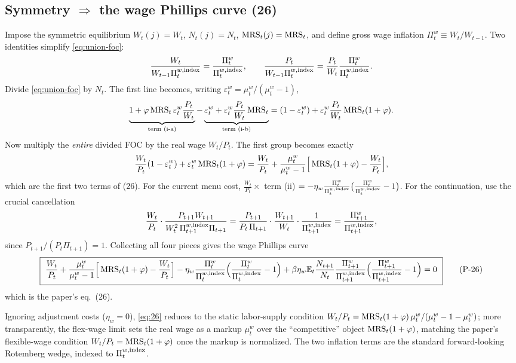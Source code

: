 \subsection{Symmetry \texorpdfstring{$\Rightarrow$}{=>} the wage Phillips curve (26)}
Impose the symmetric equilibrium $W_t(j)=W_t$, $N_t(j)=N_t$, $\operatorname{MRS}_t(j)=\operatorname{MRS}_t$, and define gross wage
inflation $\Pi^w_t\equiv W_t/W_{t-1}$. Two identities simplify \eqref{eq:union-foc}:
\[
\frac{W_t}{W_{t-1}\Pi^{w,\text{index}}_t}=\frac{\Pi^w_t}{\Pi^{w,\text{index}}_t},\qquad
\frac{P_t}{W_{t-1}\Pi^{w,\text{index}}_t}=\frac{P_t}{W_t}\frac{\Pi^w_t}{\Pi^{w,\text{index}}_t}.
\]
Divide \eqref{eq:union-foc} by $N_t$. The first line becomes, writing $\varepsilon^w_t=\mu^w_t/(\mu^w_t-1)$,
\[
\underbrace{1+\varphi\operatorname{MRS}_t\varepsilon^w_t\frac{P_t}{W_t}}_{\text{term (i-a)}}
-\underbrace{\varepsilon^w_t+\varepsilon^w_t\frac{P_t}{W_t}\operatorname{MRS}_t}_{\text{term (i-b)}}
=(1-\varepsilon^w_t)+\varepsilon^w_t\frac{P_t}{W_t}\operatorname{MRS}_t(1+\varphi).
\]
Now multiply the \emph{entire} divided FOC by the real wage $W_t/P_t$. The first group becomes exactly
\begin{equation}\label{eq:pc-static}
\frac{W_t}{P_t}(1-\varepsilon^w_t)+\varepsilon^w_t\operatorname{MRS}_t(1+\varphi)
=\frac{W_t}{P_t}+\frac{\mu^w_t}{\mu^w_t-1}\Big[\operatorname{MRS}_t(1+\varphi)-\frac{W_t}{P_t}\Big],
\end{equation}
which are the first two terms of (26). For the current menu cost, $\tfrac{W_t}{P_t}\times$ term (ii)
$=-\eta_w\frac{\Pi^w_t}{\Pi^{w,\text{index}}_t}\big(\frac{\Pi^w_t}{\Pi^{w,\text{index}}_t}-1\big)$. For the
continuation, use the crucial cancellation
\[
\frac{W_t}{P_t}\cdot\frac{P_{t+1}W_{t+1}}{W_t^2\,\Pi^{w,\text{index}}_{t+1}\Pi_{t+1}}
=\frac{P_{t+1}}{P_t\,\Pi_{t+1}}\cdot\frac{W_{t+1}}{W_t}\cdot\frac{1}{\Pi^{w,\text{index}}_{t+1}}
=\frac{\Pi^w_{t+1}}{\Pi^{w,\text{index}}_{t+1}},
\]
since $P_{t+1}/(P_t\Pi_{t+1})=1$. Collecting all four pieces gives the wage Phillips curve
\begin{equation}\label{eq:26}
\boxed{\ \frac{W_t}{P_t}+\frac{\mu^w_t}{\mu^w_t-1}\Big[\MRS_t(1+\varphi)-\frac{W_t}{P_t}\Big]
-\eta_w\frac{\Pi^w_t}{\Pi^{w,\Ind}_t}\Big(\frac{\Pi^w_t}{\Pi^{w,\Ind}_t}-1\Big)
+\beta\eta_w\E_t\frac{N_{t+1}}{N_t}\frac{\Pi^w_{t+1}}{\Pi^{w,\Ind}_{t+1}}\Big(\frac{\Pi^w_{t+1}}{\Pi^{w,\Ind}_{t+1}}-1\Big)=0\ }
\tag{P-26}
\end{equation}
which is the paper's eq.\ (26).

\begin{remark}
Ignoring adjustment costs ($\eta_w=0$), \eqref{eq:26} reduces to the static labor-supply condition
$W_t/P_t=\operatorname{MRS}_t(1+\varphi)\,\mu^w_t/(\mu^w_t-1-\mu^w_t)$; more transparently, the flex-wage limit sets
the real wage as a markup $\mu^w_t$ over the ``competitive'' object $\operatorname{MRS}_t(1+\varphi)$, matching the
paper's flexible-wage condition $W_t/P_t=\operatorname{MRS}_t(1+\varphi)$ once the markup is normalized. The two
inflation terms are the standard forward-looking Rotemberg wedge, indexed to $\Pi^{w,\text{index}}_t$.
\end{remark}

